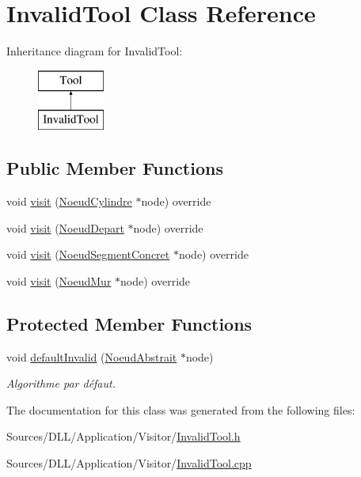 \hypertarget{class_invalid_tool}{}\section{Invalid\+Tool Class Reference}
\label{class_invalid_tool}
Inheritance diagram for Invalid\+Tool\+:\begin{figure}[H]
\begin{center}
\leavevmode
\includegraphics[height=2.000000cm]{class_invalid_tool}
\end{center}
\end{figure}
\subsection*{Public Member Functions}
\begin{DoxyCompactItemize}
\item 
void \hyperlink{group__inf2990_ga55674ebdcf4c31ced5df732e2424d282}{visit} (\hyperlink{class_noeud_cylindre}{Noeud\+Cylindre} $\ast$node) override
\item 
void \hyperlink{group__inf2990_gabbc70a0da4b0aadac5a37f1fce30cb7a}{visit} (\hyperlink{class_noeud_depart}{Noeud\+Depart} $\ast$node) override
\item 
void \hyperlink{group__inf2990_ga2f8397c63d7f895906f49ab95de03f13}{visit} (\hyperlink{class_noeud_segment_concret}{Noeud\+Segment\+Concret} $\ast$node) override
\item 
void \hyperlink{group__inf2990_gab69a438cb8d2abff211cd450c9f946f5}{visit} (\hyperlink{class_noeud_mur}{Noeud\+Mur} $\ast$node) override
\end{DoxyCompactItemize}
\subsection*{Protected Member Functions}
\begin{DoxyCompactItemize}
\item 
void \hyperlink{group__inf2990_gafb96baa12cb0df8c48c84dd12badd757}{default\+Invalid} (\hyperlink{class_noeud_abstrait}{Noeud\+Abstrait} $\ast$node)
\begin{DoxyCompactList}\small\item\em Algorithme par défaut. \end{DoxyCompactList}\end{DoxyCompactItemize}


The documentation for this class was generated from the following files\+:\begin{DoxyCompactItemize}
\item 
Sources/\+D\+L\+L/\+Application/\+Visitor/\hyperlink{_invalid_tool_8h}{Invalid\+Tool.\+h}\item 
Sources/\+D\+L\+L/\+Application/\+Visitor/\hyperlink{_invalid_tool_8cpp}{Invalid\+Tool.\+cpp}\end{DoxyCompactItemize}
